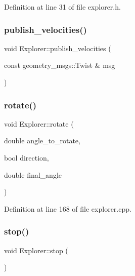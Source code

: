 Definition at line 31 of file explorer.\+h.

\mbox{\label{class_explorer_a8ffef25585ef957b9df4407366723787}} 
\subsubsection{\texorpdfstring{publish\+\_\+velocities()}{publish\_velocities()}}
{\footnotesize\ttfamily void Explorer\+::publish\+\_\+velocities (\begin{DoxyParamCaption}\item[{const geometry\+\_\+msgs\+::\+Twist \&}]{msg }\end{DoxyParamCaption})}

\mbox{\label{class_explorer_ac8e3a980fd3929734fb3a4b0b2e0a7e0}} 
\subsubsection{\texorpdfstring{rotate()}{rotate()}}
{\footnotesize\ttfamily void Explorer\+::rotate (\begin{DoxyParamCaption}\item[{double}]{angle\+\_\+to\+\_\+rotate,  }\item[{bool}]{direction,  }\item[{double}]{final\+\_\+angle }\end{DoxyParamCaption})}



Definition at line 168 of file explorer.\+cpp.

\mbox{\label{class_explorer_a0e4a623ff30d1886cc9f57ec081c527f}} 
\subsubsection{\texorpdfstring{stop()}{stop()}}
{\footnotesize\ttfamily void Explorer\+::stop (\begin{DoxyParamCaption}{ }\end{DoxyParamCaption})}



